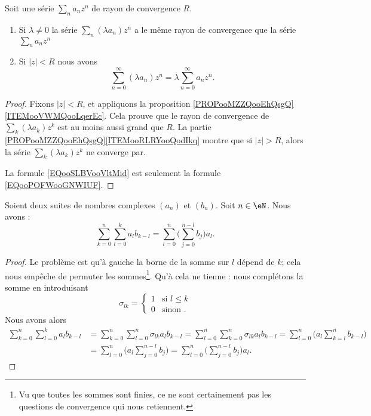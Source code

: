 \begin{theorem}     \label{THOooINHDooZxErnp}
	Soit une série \( \sum_na_nz^n\) de rayon de convergence \( R\).
	\begin{enumerate}
		\item
		      Si \( \lambda\neq 0\) la série \( \sum_n(\lambda a_n)z^n\) a le même rayon de convergence que la série \( \sum_na_nz^n\)
		\item
		      Si \( | z |<R\) nous avons
		      \begin{equation}	\label{EQooSLBVooVltMid}
			      \sum_{n=0}^{\infty}(\lambda a_n)z^n=\lambda\sum_{n=0}^{\infty}a_nz^n.
		      \end{equation}
	\end{enumerate}
\end{theorem}

\begin{proof}
	Fixons \(| z |<R\), et appliquons la proposition \ref{PROPooMZZQooEhQsgQ}\ref{ITEMooVWMQooLqerEc}. Cela prouve que le rayon de convergence de \( \sum_k(\lambda a_k)z^k\) est au moins aussi grand que \( R\). La partie \ref{PROPooMZZQooEhQsgQ}\ref{ITEMooRLRYooQodIkq} montre que si \( | z |>R\), alors la série \( \sum_k(\lambda a_k)z^k\) ne converge par.

	La formule \eqref{EQooSLBVooVltMid} est seulement la formule \eqref{EQooPOFWooGNWIUF}.
\end{proof}


\begin{lemma}       \label{LEMooNYAXooKUuQFe}
	Soient deux suites de nombres complexes \( (a_n)\) et \( (b_n)\). Soit \( n\in \eN\). Nous avons :
	\begin{equation}
		\sum_{k=0}^n\sum_{l=0}^ka_lb_{k-l}=\sum_{l=0}^n\big( \sum_{j=0}^{n-l}b_j \big)a_l.
	\end{equation}
\end{lemma}

\begin{proof}
	Le problème est qu'à gauche la borne de la somme sur \( l\) dépend de \( k\); cela nous empêche de permuter les sommes\footnote{Vu que toutes les sommes sont finies, ce ne sont certainement pas les questions de convergence qui nous retiennent.}. Qu'à cela ne tienne : nous complétons la somme en introduisant
	\begin{equation}
		\sigma_{lk}=\begin{cases}
			1 & \text{si } l\leq k \\
			0 & \text{sinon }.
		\end{cases}
	\end{equation}
	Nous avons alors
	\begin{subequations}
		\begin{align}
			\sum_{k=0}^n\sum_{l=0}^ka_lb_{k-l} & =\sum_{k=0}^n\sum_{l=0}^n\sigma_{lk}a_lb_{k-l}=\sum_{l=0}^n\sum_{k=0}^n\sigma_{lk}a_lb_{k-l} =\sum_{l=0}^n\big( a_l\sum_{k=l}^nb_{k-l} \big) \\
			                                   & =\sum_{l=0}^n\big( a_l\sum_{j=0}^{n-l}b_j \big)=\sum_{l=0}^n\big( \sum_{j=0}^{n-l}b_j \big)a_l.
		\end{align}
	\end{subequations}
\end{proof}

